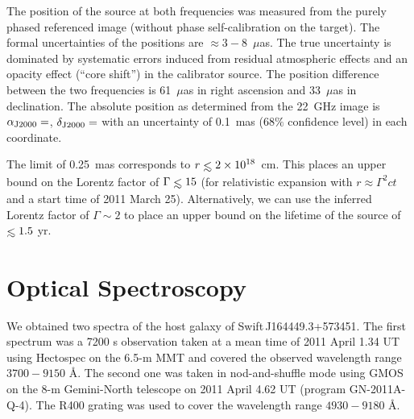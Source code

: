 The position of the source at both frequencies was measured from the
purely phased referenced image (without phase self-calibration on the
target).  The formal uncertainties of the positions are 
$\approx 3-8$~$\mu$as.  The true uncertainty is dominated by systematic errors
induced from residual atmospheric effects and an opacity effect
(``core shift'') in the calibrator source. The position difference
between the two frequencies is 61~$\mu$as in right ascension and 
33~$\mu$as in declination.  The absolute position as determined from the
22~GHz image is $\alpha_{\rm J2000}=$,
$\delta_{\rm J2000}=$ with an uncertainty of 
0.1~mas ($68\%$ confidence level) in each coordinate.

The limit of 0.25~mas corresponds to $r\simlt 2\times 10^{18}$~cm.
This places an upper bound on the Lorentz factor of $\Gamma\simlt 15$
(for relativistic expansion with $r\approx\Gamma^2ct$ and a start time
of 2011 March 25).  Alternatively, we can use the inferred Lorentz
factor of $\Gamma\sim 2$ to place an upper bound on the lifetime of
the source of $\simlt 1.5$ yr.


\section{Optical Spectroscopy}
\label{sec:opt}

We obtained two spectra of the host galaxy of Swift\,J164449.3+573451.
The first spectrum was a 7200 s observation taken at a mean time of
2011 April 1.34 UT using Hectospec on the 6.5-m MMT and covered the
observed wavelength range $3700-9150$ \AA.  The second one was taken
in nod-and-shuffle mode using GMOS on the 8-m Gemini-North telescope
on 2011 April 4.62 UT (program GN-2011A-Q-4).  The R400 grating was
used to cover the wavelength range $4930-9180$ \AA.

